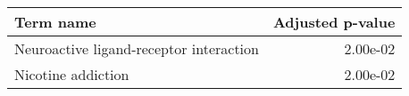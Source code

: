 \begin{tabular}{lr}
\toprule
                              Term name &  Adjusted p-value \\
\midrule
Neuroactive ligand-receptor interaction &          2.00e-02 \\
                     Nicotine addiction &          2.00e-02 \\
\bottomrule
\end{tabular}
